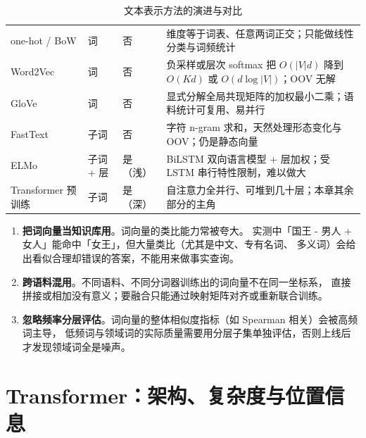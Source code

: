 \begin{table}[htbp]
\centering
\caption{文本表示方法的演进与对比}
\label{tab:repr-evolution}
\small
\begin{tabularx}{\textwidth}{L{2.3cm} L{2.0cm} L{1.6cm} Y}
\toprule
{} &  &  &  \\
\midrule
one-hot / BoW & 词 & 否 & 维度等于词表、任意两词正交；只能做线性分类与词频统计 \\
\addlinespace
Word2Vec & 词 & 否 & 负采样或层次 softmax 把 $O(|V|d)$ 降到 $O(Kd)$ 或 $O(d\log|V|)$；OOV 无解 \\
\addlinespace
GloVe & 词 & 否 & 显式分解全局共现矩阵的加权最小二乘；语料统计可复用、易并行 \\
\addlinespace
FastText & 子词 & 否 & 字符 n-gram 求和，天然处理形态变化与 OOV；仍是静态向量 \\
\addlinespace
ELMo & 子词 + 层 & 是（浅） & BiLSTM 双向语言模型 + 层加权；受 LSTM 串行特性限制，难以做大 \\
\addlinespace
Transformer 预训练 & 子词 & 是（深） & 自注意力全并行、可堆到几十层；本章其余部分的主角 \\
\bottomrule
\end{tabularx}
\end{table}

\begin{pitfall}[静态词向量在生产里的三个坑]
\begin{enumerate}
  \item \textbf{把词向量当知识库用}。词向量的类比能力常被夸大。
        实测中「国王 - 男人 + 女人」能命中「女王」，但大量类比（尤其是中文、专有名词、
        多义词）会给出看似合理却错误的答案，不能用来做事实查询。
  \item \textbf{跨语料混用}。不同语料、不同分词器训练出的词向量不在同一坐标系，
        直接拼接或相加没有意义；要融合只能通过映射矩阵对齐或重新联合训练。
  \item \textbf{忽略频率分层评估}。词向量的整体相似度指标（如 Spearman 相关）会被高频词主导，
        低频词与领域词的实际质量需要用分层子集单独评估，否则上线后才发现领域词全是噪声。
\end{enumerate}
\end{pitfall}

\section{Transformer：架构、复杂度与位置信息}
\label{sec:nlp-transformer}

